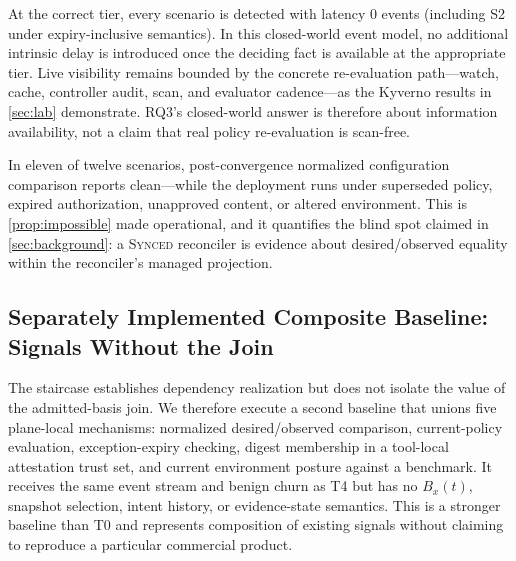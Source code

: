 \begin{finding}
\label{fnd:latency}
At the correct tier, every scenario is detected with latency 0 events
(including S2 under expiry-inclusive semantics). In this closed-world event
model, no additional intrinsic delay is introduced once the deciding fact is
available at the appropriate tier. Live visibility remains bounded by the
concrete re-evaluation path---watch, cache, controller audit, scan, and
evaluator cadence---as the Kyverno results in \cref{sec:lab} demonstrate.
RQ3's closed-world answer is therefore about information availability, not a
claim that real policy re-evaluation is scan-free.
\end{finding}

\begin{finding}
\label{fnd:blind}
In eleven of twelve scenarios, post-convergence normalized configuration
comparison reports clean---while the
deployment runs under superseded policy, expired authorization, unapproved
content, or altered environment. This is \cref{prop:impossible} made
operational, and it quantifies the blind spot claimed in
\cref{sec:background}: a \textnormal{\textsc{Synced}} reconciler is evidence
about desired/observed equality within the reconciler's managed projection.
\end{finding}

\subsection{Separately Implemented Composite Baseline: Signals Without the Join}
The staircase establishes dependency realization but does not isolate the
value of the admitted-basis join. We therefore execute a second baseline that
unions five plane-local mechanisms: normalized desired/observed comparison,
current-policy evaluation, exception-expiry checking, digest membership in a
tool-local attestation trust set, and current environment posture against a
benchmark. It receives the same event stream and benign churn as T4 but has
no $B_x(t)$, snapshot selection, intent history, or evidence-state semantics.
This is a stronger baseline than T0 and represents composition of existing
signals without claiming to reproduce a particular commercial product.

\begin{table}[t]
\centering
\caption{Separately Implemented Plane-Local Baseline Versus the Admitted-Basis Join.
Exact Columns Are Percentages Over 20 Seeds; Empty Local Output on S9 Means
the Deleted Governance Stream Is Outside Its Vocabulary.}
\label{tab:join-baseline}
\footnotesize

\end{table}

